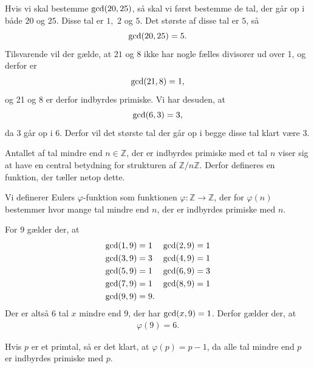 \begin{exa}
Hvis vi skal bestemme $\textnormal{gcd}(20,25)$, så skal vi først bestemme de tal, der går op i både $20$ og $25$. Disse tal er $1,$ $2$ og $5$. Det største af disse tal er $5$, så 
\[
\textnormal{gcd}(20,25) = 5.
\]
Tilsvarende vil der gælde, at $21$ og $8$ ikke har nogle fælles divisorer ud over 1, og derfor er 
\begin{align*}
	\textnormal{gcd}(21,8) = 1,
\end{align*}
og 21 og 8 er derfor indbyrdes primiske. Vi har desuden, at 
\[
\textnormal{gcd}(6,3) = 3,
\]
da $3$ går op i $6$. Derfor vil det største tal der går op i begge disse tal klart være $3$. 
\end{exa}
Antallet af tal mindre end $n\in \mathbb{Z}$, der er indbyrdes primiske med et tal $n$ viser sig at have en central betydning for strukturen af $\mathbb{Z}/n\mathbb{Z}$. Derfor defineres en funktion, der tæller netop dette.
\begin{defn}
	Vi definerer Eulers $\varphi$-funktion som funktionen $\varphi: \mathbb{Z} \to \mathbb{Z}$, der for $\varphi(n)$ 
	bestemmer hvor mange tal mindre end $n$, der er indbyrdes primiske med $n$. 
\end{defn}
\begin{exa}
For $9$ gælder der, at 
\begin{align*}
&\textnormal{gcd}(1,9) = 1
&&\textnormal{gcd}(2,9) = 1\\
&\textnormal{gcd}(3,9) = 3
&&\textnormal{gcd}(4,9) = 1\\
&\textnormal{gcd}(5,9) = 1
&&\textnormal{gcd}(6,9) = 3\\
&\textnormal{gcd}(7,9) = 1
&&\textnormal{gcd}(8,9) = 1\\
&\textnormal{gcd}(9,9) = 9.
\end{align*}
Der er altså 6 tal $x$ mindre end $9$, der har $\textnormal{gcd}(x,9)=1$. Derfor gælder der, at 
\begin{align*}
\varphi(9) = 6. 
\end{align*}
\end{exa}
\begin{exa}
Hvis $p$ er et primtal, så er det klart, at $\varphi(p) = p-1$, da alle tal mindre end $p$ er indbyrdes primiske med $p$.
\end{exa}

